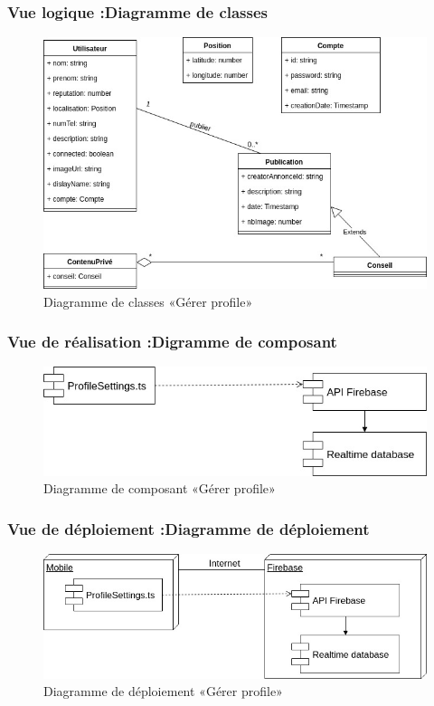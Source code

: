 \documentclass[11pt,a4paper,oneside]{book}
\begin{document}
				\subsubsection{Vue logique :Diagramme de classes}
				\begin{figure}[H]
					\centering
					\includegraphics[width=1\textwidth]{Images/ch3/ClasseGererProfile}
					\caption{Diagramme de classes «Gérer profile»}
					\label{fig:classegererprofile}
				\end{figure}
				
				\subsubsection{Vue de réalisation :Digramme de composant}
				\begin{figure}[H]
					\centering
					\includegraphics[width=1.2\textwidth]{Images/ch3/ComposantProfileSettings}
					\caption{Diagramme de composant «Gérer profile»}
					\label{fig:composantprofilesettings}
				\end{figure}
				
				
				\subsubsection{Vue de déploiement :Diagramme de déploiement}
				\begin{figure}[H]
					\centering
					\includegraphics[width=1\textwidth]{Images/ch3/deploimentProfileSettings}
					\caption{Diagramme de déploiement «Gérer profile»}
					\label{fig:deploimentprofilesettings}
				\end{figure}
\end{document}
